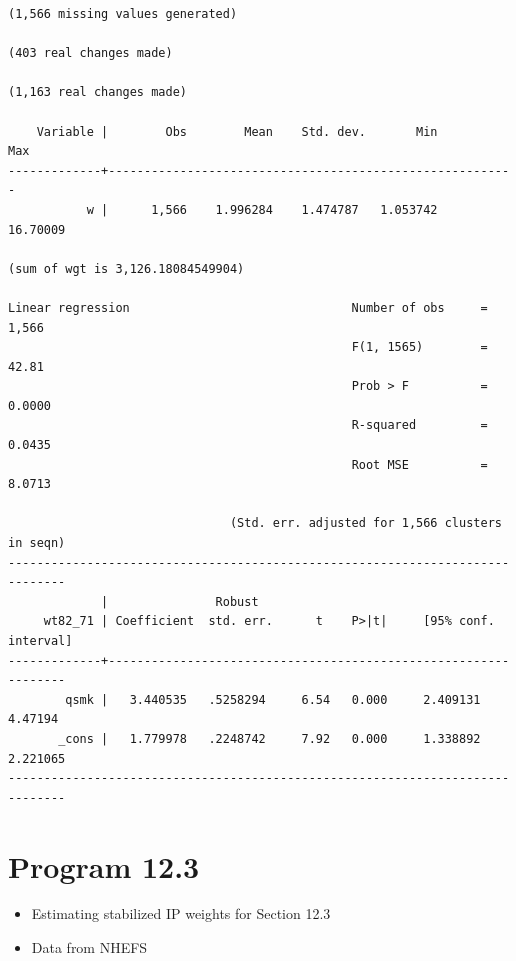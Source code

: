 \documentclass[
  10pt,
  a4paper,
]{book}
\providecommand{\tightlist}{%
  \setlength{\itemsep}{0pt}\setlength{\parskip}{0pt}}
\begin{document}
\begin{verbatim}
(1,566 missing values generated)

(403 real changes made)

(1,163 real changes made)

    Variable |        Obs        Mean    Std. dev.       Min        Max
-------------+---------------------------------------------------------
           w |      1,566    1.996284    1.474787   1.053742   16.70009

(sum of wgt is 3,126.18084549904)

Linear regression                               Number of obs     =      1,566
                                                F(1, 1565)        =      42.81
                                                Prob > F          =     0.0000
                                                R-squared         =     0.0435
                                                Root MSE          =     8.0713

                               (Std. err. adjusted for 1,566 clusters in seqn)
------------------------------------------------------------------------------
             |               Robust
     wt82_71 | Coefficient  std. err.      t    P>|t|     [95% conf. interval]
-------------+----------------------------------------------------------------
        qsmk |   3.440535   .5258294     6.54   0.000     2.409131     4.47194
       _cons |   1.779978   .2248742     7.92   0.000     1.338892    2.221065
------------------------------------------------------------------------------
\end{verbatim}

\section{Program 12.3}\label{program-12.3-1}

\begin{itemize}
\tightlist
\item
  Estimating stabilized IP weights for Section 12.3
\item
  Data from NHEFS
\end{itemize}
\end{document}
